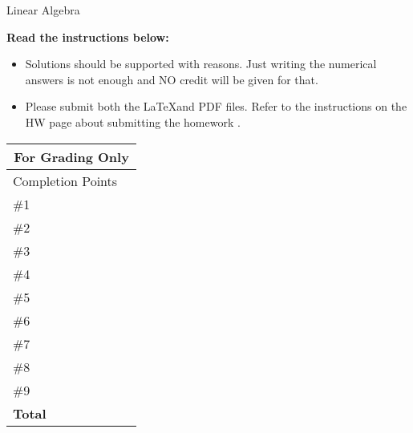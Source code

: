 \newcommand{\circlescale}{& \circled{5} \hspace*{0.2cm} \circled{4} \hspace*{0.2cm} \circled{3} \hspace*{0.2cm} \circled{2} \hspace*{0.2cm} \circled{0}\\\midrule}
\begin{minipage}{6in}
    {\Large \mycourse \hfill Linear Algebra \hfill \semesteryear}
    \begin{center}
    \end{center}
\end{minipage}
\vspace*{0.3cm}

\textbf{Read the instructions below:}
\begin{itemize}
    \item Solutions should be supported with reasons. Just writing the numerical answers is not enough and NO credit will be given for that.
    \item Please submit both the \LaTeX and PDF files. Refer to the instructions on the HW page about submitting the homework .
\end{itemize}

\begin{center}
\end{center}


\renewcommand{\arraystretch}{1.3}
\begin{tabular}{lc}
  \toprule[2pt]
  \multicolumn{2}{c}{\bfseries For Grading Only}\\ \toprule[2pt]
  Completion Points \circlescale
  \#1               \circlescale
  \#2               \circlescale
  \#3               \circlescale
  \#4               \circlescale
  \#5               \circlescale
  \#6               \circlescale
  \#7               \circlescale
  \#8               \circlescale
  \#9               \circlescale
  \textbf{Total} & \\
  \bottomrule[2pt]
\end{tabular}
